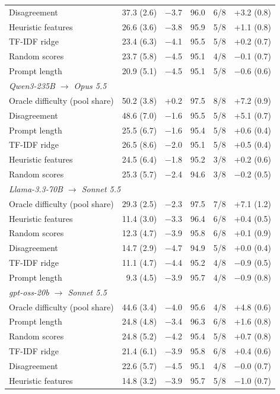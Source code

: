 \begin{longtable}{lrrrrr}
Disagreement & 37.3 (2.6) & $-$3.7 & 96.0 & 6/8 & +3.2 (0.8) \\
Heuristic features & 26.6 (3.6) & $-$3.8 & 95.9 & 5/8 & +1.1 (0.8) \\
TF-IDF ridge & 23.4 (6.3) & $-$4.1 & 95.5 & 5/8 & +0.2 (0.7) \\
Random scores & 23.7 (5.8) & $-$4.5 & 95.1 & 4/8 & $-$0.1 (0.7) \\
Prompt length & 20.9 (5.1) & $-$4.5 & 95.1 & 5/8 & $-$0.6 (0.6) \\
\midrule
\multicolumn{6}{l}{\emph{Qwen3-235B $\to$ Opus 5.5}} \\
Oracle difficulty (pool share) & 50.2 (3.8) & +0.2 & 97.5 & 8/8 & +7.2 (0.9) \\
Disagreement & 48.6 (7.0) & $-$1.6 & 95.5 & 5/8 & +5.1 (0.7) \\
Prompt length & 25.5 (6.7) & $-$1.6 & 95.4 & 5/8 & +0.6 (0.4) \\
TF-IDF ridge & 26.5 (8.6) & $-$2.0 & 95.1 & 5/8 & +0.5 (0.4) \\
Heuristic features & 24.5 (6.4) & $-$1.8 & 95.2 & 3/8 & +0.2 (0.6) \\
Random scores & 25.3 (5.7) & $-$2.4 & 94.6 & 3/8 & $-$0.2 (0.5) \\
\midrule
\multicolumn{6}{l}{\emph{Llama-3.3-70B $\to$ Sonnet 5.5}} \\
Oracle difficulty (pool share) & 29.3 (2.5) & $-$2.3 & 97.5 & 7/8 & +7.1 (1.2) \\
Heuristic features & 11.4 (3.0) & $-$3.3 & 96.4 & 6/8 & +0.4 (0.5) \\
Random scores & 12.3 (4.7) & $-$3.9 & 95.8 & 6/8 & +0.1 (0.9) \\
Disagreement & 14.7 (2.9) & $-$4.7 & 94.9 & 5/8 & +0.0 (0.4) \\
TF-IDF ridge & 11.1 (4.7) & $-$4.4 & 95.2 & 4/8 & $-$0.9 (0.5) \\
Prompt length & 9.3 (4.5) & $-$3.9 & 95.7 & 4/8 & $-$0.9 (0.8) \\
\midrule
\multicolumn{6}{l}{\emph{gpt-oss-20b $\to$ Sonnet 5.5}} \\
Oracle difficulty (pool share) & 44.6 (3.4) & $-$4.0 & 95.6 & 4/8 & +4.8 (0.6) \\
Prompt length & 24.8 (4.8) & $-$3.4 & 96.3 & 6/8 & +1.6 (0.8) \\
Random scores & 24.8 (5.2) & $-$4.2 & 95.4 & 5/8 & +0.7 (0.8) \\
TF-IDF ridge & 21.4 (6.1) & $-$3.9 & 95.8 & 6/8 & +0.4 (0.6) \\
Disagreement & 22.6 (5.7) & $-$4.5 & 95.1 & 4/8 & $-$0.0 (0.7) \\
Heuristic features & 14.8 (3.2) & $-$3.9 & 95.7 & 5/8 & $-$1.0 (0.7) \\
\bottomrule
\end{longtable}
